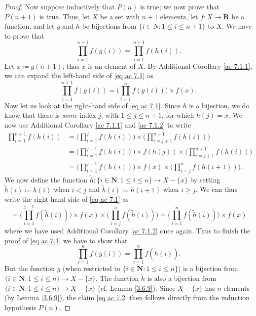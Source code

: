 \begin{proof}
    Now suppose inductively that \(P(n)\) is true;
    we now prove that \(P(n + 1)\) is true.
    Thus, let \(X\) be a set with \(n + 1\) elements, let \(f : X \to \mathbf{R}\) be a function, and let \(g\) and \(h\) be bijections from \(\{i \in N : 1 \leq i \leq n + 1\}\) to \(X\).
    We have to prove that
    \[
        \prod_{i = 1}^{n + 1} f(g(i)) = \prod_{i = 1}^{n + 1} f(h(i)). \tag{ac 7.1}\label{eq ac 7.1}
    \]
    Let \(x \coloneqq g(n + 1)\);
    thus \(x\) is an element of \(X\).
    By Additional Corollary \ref{ac 7.1.1}, we can expand the left-hand side of \eqref{eq ac 7.1} as
    \[
        \prod_{i = 1}^{n + 1} f(g(i)) = \Bigg(\prod_{i = 1}^n f(g(i))\Bigg) \times f(x).
    \]
    Now let us look at the right-hand side of \eqref{eq ac 7.1}.
    Since \(h\) is a bijection, we do know that there is \emph{some} index \(j\), with \(1 \leq j \leq n + 1\), for which \(h(j) = x\).
    We now use Additional Corollary \ref{ac 7.1.1} and \ref{ac 7.1.2} to write
    \begin{align*}
        \prod_{i = 1}^{n + 1} f(h(i)) & = \Bigg(\prod_{i = 1}^j f(h(i))\Bigg) \times \Bigg(\prod_{i = j + 1}^{n + 1} f(h(i))\Bigg)                      \\
                                      & = \Bigg(\prod_{i = 1}^{j - 1} f(h(i))\Bigg) \times f(h(j)) \times \Bigg(\prod_{i = j + 1}^{n + 1} f(h(i))\Bigg) \\
                                      & = \Bigg(\prod_{i = 1}^{j - 1} f(h(i))\Bigg) \times f(x) \times \Bigg(\prod_{i = j}^n f(h(i + 1))\Bigg).
    \end{align*}
    We now define the function \(\tilde{h} : \{i \in \mathbf{N} : 1 \leq i \leq n\} \to X - \{x\}\) by setting \(\tilde{h}(i) \coloneqq h(i)\) when \(i < j\) and \(\tilde{h}(i) \coloneqq h(i + 1)\) when \(i \geq j\).
    We can thus write the right-hand side of \eqref{eq ac 7.1} as
    \[
        = \Bigg(\prod_{i = 1}^{j - 1} f(\tilde{h}(i))\Bigg) \times f(x) \times \Bigg(\prod_{i = j}^n f(\tilde{h}(i))\Bigg) = \Bigg(\prod_{i = 1}^n f(\tilde{h}(i))\Bigg) \times f(x)
    \]
    where we have used Additional Corollary \ref{ac 7.1.2} once again.
    Thus to finish the proof of \eqref{eq ac 7.1} we have to show that
    \[
        \prod_{i = 1}^n f(g(i)) = \prod_{i = 1}^n f(\tilde{h}(i)). \tag{ac 7.2}\label{eq ac 7.2}
    \]
    But the function \(g\) (when restricted to \(\{i \in \mathbf{N} : 1 \leq i \leq n\}\)) is a bijection from \(\{i \in \mathbf{N} : 1 \leq i \leq n\} \to X - \{x\}\).
    The function \(\tilde{h}\) is also a bijection from \(\{i \in \mathbf{N} : 1 \leq i \leq n\} \to X - \{x\}\) (cf. Lemma \ref{3.6.9}).
    Since \(X - \{x\}\) has \(n\) elements (by Lemma \ref{3.6.9}), the claim \eqref{eq ac 7.2} then follows directly from the induction hypothesis \(P(n)\).
\end{proof}

